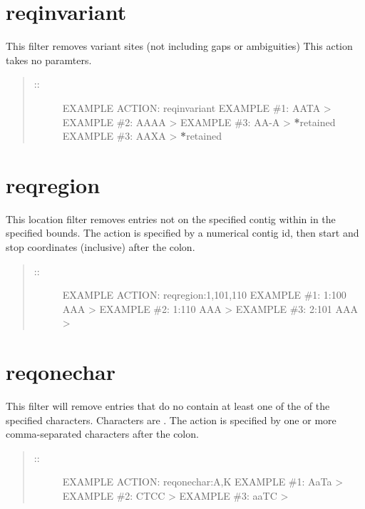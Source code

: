 \documentclass[letterpaper,11pt,english]{sphinxmanual}
\begin{document}
\section{reqinvariant}
\label{\detokenize{mvf_filter_modules:reqinvariant}}
This filter removes variant sites (not including gaps or ambiguities)
This action takes no paramters.
\begin{quote}
\begin{description}
\item[{::}] \leavevmode
EXAMPLE ACTION: reqinvariant
EXAMPLE \#1: AATA \textendash{}\textgreater{} 
EXAMPLE \#2: AAAA \textendash{}\textgreater{} 
EXAMPLE \#3: AA-A \textendash{}\textgreater{} {\color{red}\bfseries{}*}retained
EXAMPLE \#3: AAXA \textendash{}\textgreater{} {\color{red}\bfseries{}*}retained

\end{description}
\end{quote}


\section{reqregion}
\label{\detokenize{mvf_filter_modules:reqregion}}
This location filter removes entries not on the specified contig
within in the specified bounds.
The action is specified by a numerical contig id, then start and
stop coordinates (inclusive) after the colon.
\begin{quote}
\begin{description}
\item[{::}] \leavevmode
EXAMPLE ACTION: reqregion:1,101,110
EXAMPLE \#1: 1:100 AAA \textendash{}\textgreater{} 
EXAMPLE \#2: 1:110 AAA \textendash{}\textgreater{} 
EXAMPLE \#3: 2:101 AAA \textendash{}\textgreater{} 

\end{description}
\end{quote}


\section{reqonechar}
\label{\detokenize{mvf_filter_modules:reqonechar}}
This filter will remove entries that do no contain at least
one of the of the specified  characters. Characters are
. The action is specified by one or more
comma-separated characters after the colon.
\begin{quote}
\begin{description}
\item[{::}] \leavevmode
EXAMPLE ACTION: reqonechar:A,K
EXAMPLE \#1: AaTa \textendash{}\textgreater{} 
EXAMPLE \#2: CTCC \textendash{}\textgreater{} 
EXAMPLE \#3: aaTC \textendash{}\textgreater{} 

\end{description}
\end{quote}
\end{document}
